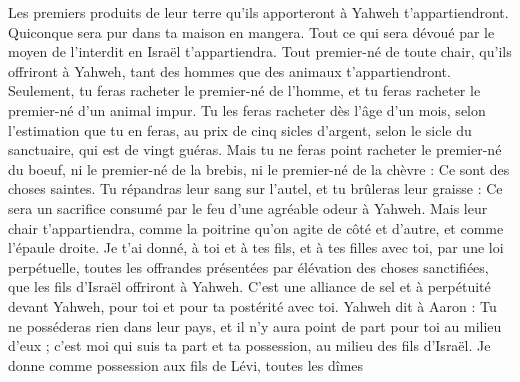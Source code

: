 \begin{multicols}{2}
Les premiers produits de leur terre qu'ils apporteront à Yahweh t'appartiendront. Quiconque sera pur dans ta maison en mangera.
Tout ce qui sera dévoué par le moyen de l’interdit en Israël t'appartiendra.
Tout premier-né de toute chair, qu'ils offriront à Yahweh, tant des hommes que des animaux t'appartiendront. Seulement, tu feras racheter le premier-né de l'homme, et tu feras racheter  le premier-né d’un animal impur.
Tu les feras racheter dès l'âge d'un mois, selon l'estimation que tu en feras, au prix de cinq sicles d'argent, selon le sicle du sanctuaire, qui est de vingt guéras.
Mais tu ne feras point racheter le premier-né du boeuf, ni le premier-né de la brebis, ni le premier-né de la chèvre : Ce sont des choses saintes. Tu répandras leur sang sur l'autel, et tu brûleras leur graisse : Ce sera un sacrifice consumé par le feu d’une agréable odeur à Yahweh.
Mais leur chair t'appartiendra, comme la poitrine qu’on agite de côté et d’autre, et comme l'épaule droite.
Je t'ai donné, à toi et à tes fils, et à tes filles avec toi, par une loi perpétuelle, toutes les offrandes présentées par élévation des choses sanctifiées, que les fils d'Israël offriront à Yahweh. C’est une alliance de sel et à perpétuité devant Yahweh, pour toi et pour ta postérité avec toi.
Yahweh dit à Aaron : Tu ne posséderas rien dans leur pays, et il n’y aura point de part pour toi au milieu d’eux ; c’est moi qui suis ta part et ta possession, au milieu des fils d'Israël.
Je donne comme possession aux fils de Lévi, toutes les dîmes
\end{multicols}

